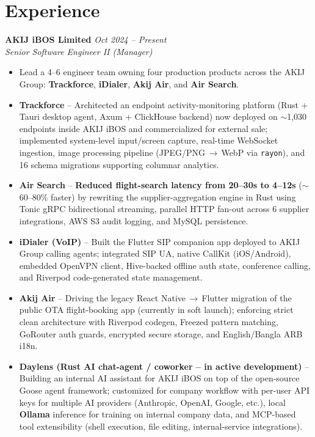 \documentclass[a4paper,10pt]{article}
\begin{document}
\section*{Experience}
\vspace{-4mm}

\noindent\textbf{AKIJ iBOS Limited} \hfill \textit{Oct 2024 -- Present}\\
\textit{Senior Software Engineer II (Manager)}
\begin{itemize}[leftmargin=*, noitemsep, topsep=2pt, parsep=0pt, partopsep=0pt]
    \item Lead a 4--6 engineer team owning four production products across the AKIJ Group: \textbf{Trackforce}, \textbf{iDialer}, \textbf{Akij Air}, and \textbf{Air Search}.
    \item \textbf{Trackforce} -- Architected an endpoint activity-monitoring platform (Rust + Tauri desktop agent, Axum + ClickHouse backend) now deployed on $\sim$1{,}030 endpoints inside AKIJ iBOS and commercialized for external sale; implemented system-level input/screen capture, real-time WebSocket ingestion, image processing pipeline (JPEG/PNG\,$\rightarrow$\,WebP via \texttt{rayon}), and 16 schema migrations supporting columnar analytics.
    \item \textbf{Air Search} -- \textbf{Reduced flight-search latency from 20--30s to 4--12s} ($\sim$60--80\% faster) by rewriting the supplier-aggregation engine in Rust using Tonic gRPC bidirectional streaming, parallel HTTP fan-out across 6 supplier integrations, AWS S3 audit logging, and MySQL persistence.
    \item \textbf{iDialer (VoIP)} -- Built the Flutter SIP companion app deployed to AKIJ Group calling agents; integrated SIP UA, native CallKit (iOS/Android), embedded OpenVPN client, Hive-backed offline auth state, conference calling, and Riverpod code-generated state management.
    \item \textbf{Akij Air} -- Driving the legacy React Native\,$\rightarrow$\,Flutter migration of the public OTA flight-booking app (currently in soft launch); enforcing strict clean architecture with Riverpod codegen, Freezed pattern matching, GoRouter auth guards, encrypted secure storage, and English/Bangla ARB i18n.
    \item \textbf{Daylens (Rust AI chat-agent / coworker -- in active development)} -- Building an internal AI assistant for AKIJ iBOS on top of the open-source Goose agent framework; customized for company workflow with per-user API keys for multiple AI providers (Anthropic, OpenAI, Google, etc.), local \textbf{Ollama} inference for training on internal company data, and MCP-based tool extensibility (shell execution, file editing, internal-service integrations).
\end{itemize}
\end{document}
